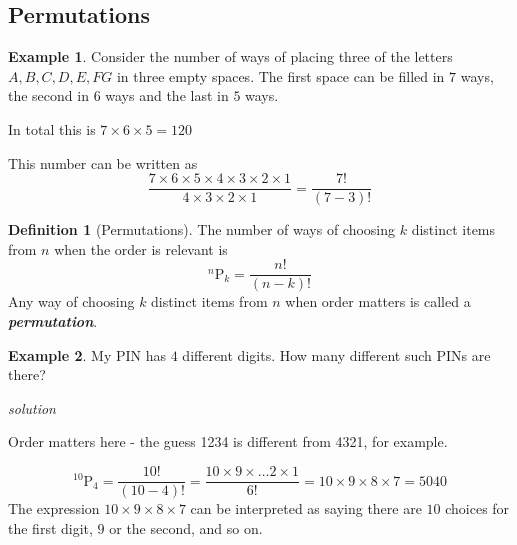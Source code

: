 \documentclass[
]{book}
\theoremstyle{definition}
\newtheorem{definition}{Definition}[chapter]
\theoremstyle{definition}
\newtheorem{example}{Example}[chapter]
\theoremstyle{definition}
\theoremstyle{definition}
\theoremstyle{remark}
\begin{document}
\hypertarget{permutations}{%
\subsection{Permutations}\label{permutations}}

\begin{example}
Consider the number of ways of placing three of the letters \(A,B,C,D,E,F G\) in three empty spaces. The first space can be filled in \(7\) ways, the second in \(6\) ways and the last in \(5\) ways.

In total this is \(7\times 6\times 5 = 120\)

This number can be written as
\[\frac{7\times 6 \times 5\times 4\times 3\times 2\times 1}{4\times 3 \times 2\times 1}=\frac{7!}{(7-3)!}\]
\end{example}

\begin{definition}[Permutations]
The number of ways of choosing \(k\) distinct items from \(n\) when the order is relevant is
\[^n\text{P}_k = \frac{n!}{(n-k)!}\]
Any way of choosing \(k\) distinct items from \(n\) when order matters is called a \textbf{\emph{permutation}}.
\end{definition}

\begin{example}
My PIN has \(4\) different digits. How many different such PINs are there?

\emph{solution}

Order matters here - the guess 1234 is different from 4321, for example.

\[^{10}\text{P}_4 = \frac{10!}{(10-4)!} = \frac{10\times 9 \times \dots 2 \times 1 }{6!} =10\times 9 \times 8 \times 7 =5040\]
The expression \(10\times 9 \times 8 \times 7\) can be interpreted as saying there are \(10\) choices for the first digit, \(9\) or the second, and so on.
\end{example}
\end{document}
